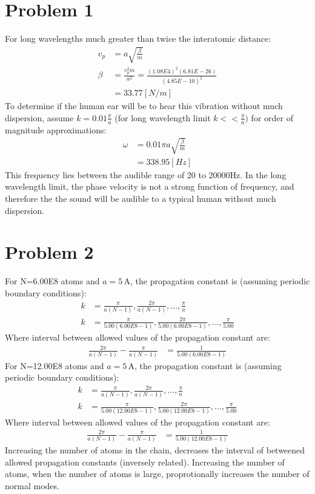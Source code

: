 \documentclass{article}
\newcommand{\unit}[1]{\ensuremath{\, \mathrm{#1}}}
\numberwithin{equation}{section}
\begin{document}
\section*{Problem 1}

For long wavelengths much greater than twice the interatomic distance:
\begin{align*}
	v_p &= a\sqrt{\frac{\beta}{m}}
\\     \beta &= \frac{v_p^2m}{a^2}=\frac{(1.08E4)^2(6.81E-26)}{(4.85E-10)^2}
\\		&=33.77 [N/m]
\end{align*}
To determine if the human ear will be to hear this vibration without much dispersion, assume $k=0.01 \frac{\pi}{a}$ (for long wavelength limit $k<<\frac{\pi}{a})$ for order of magnitude approximations:
\begin{align*}
	\omega &= 0.01 \pi a \sqrt{\frac{\beta}{m}}
\\      &= 338.95 [Hz]
\end{align*}
This frequency lies between the audible range of 20 to 20000Hz. In the long wavelength limit, the phase velocity is not a strong function of frequency, and therefore the the sound will be audible to a typical human without much dispersion.

\section*{Problem 2}
For N=6.00E8 atoms and $a=5 \unit{A}$, the propagation constant is (assuming periodic boundary conditions):
\begin{align*}
	k &= \frac{\pi}{a(N-1)},\frac{2\pi}{a(N-1)},...,\frac{\pi}{a}
\\      k &= \frac{\pi}{5.00(6.00E8-1)},\frac{2\pi}{5.00(6.00E8-1)},...,\frac{\pi}{5.00}
\end{align*}
Where interval between allowed values of the propagation constant are:
\begin{align*}
	\frac{2\pi}{a(N-1)}-\frac{\pi}{a(N-1)}&=\frac{1}{5.00(6.00E8-1)}
\end{align*}
For N=12.00E8 atoms and $a=5 \unit{A}$, the propagation constant is (assuming periodic boundary conditions):
\begin{align*}
	k &= \frac{\pi}{a(N-1)},\frac{2\pi}{a(N-1)},...,\frac{\pi}{a}
\\      k &= \frac{\pi}{5.00(12.00E8-1)},\frac{2\pi}{5.00(12.00E8-1)},...,\frac{\pi}{5.00}
\end{align*}
Where interval between allowed values of the propagation constant are:
\begin{align*}
	\frac{2\pi}{a(N-1)}-\frac{\pi}{a(N-1)}&=\frac{1}{5.00(12.00E8-1)}
\end{align*}
Increasing the number of atoms in the chain, decreases the interval of betweened allowed propagation constants (inversely related). Increasing the number of atoms, when the number of atoms is large, proprotionally increases the number of normal modes.
\end{document}
